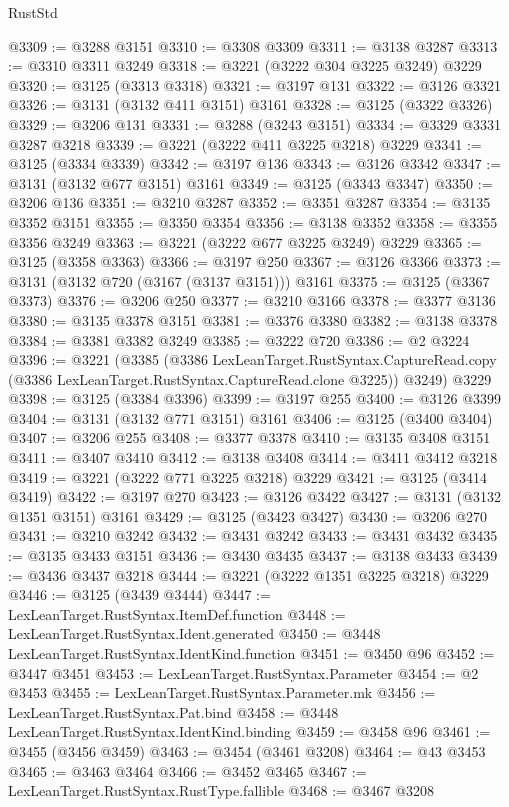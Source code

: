 \begin{lexlean}{RustStd}
\begin{coremodule}
@3309 := @3288 @3151
@3310 := @3308 @3309
@3311 := @3138 @3287
@3313 := @3310 @3311 @3249
@3318 := @3221 (@3222 @304 @3225 @3249) @3229
@3320 := @3125 (@3313 @3318)
@3321 := @3197 @131
@3322 := @3126 @3321
@3326 := @3131 (@3132 @411 @3151) @3161
@3328 := @3125 (@3322 @3326)
@3329 := @3206 @131
@3331 := @3288 (@3243 @3151)
@3334 := @3329 @3331 @3287 @3218
@3339 := @3221 (@3222 @411 @3225 @3218) @3229
@3341 := @3125 (@3334 @3339)
@3342 := @3197 @136
@3343 := @3126 @3342
@3347 := @3131 (@3132 @677 @3151) @3161
@3349 := @3125 (@3343 @3347)
@3350 := @3206 @136
@3351 := @3210 @3287
@3352 := @3351 @3287
@3354 := @3135 @3352 @3151
@3355 := @3350 @3354
@3356 := @3138 @3352
@3358 := @3355 @3356 @3249
@3363 := @3221 (@3222 @677 @3225 @3249) @3229
@3365 := @3125 (@3358 @3363)
@3366 := @3197 @250
@3367 := @3126 @3366
@3373 := @3131 (@3132 @720 (@3167 (@3137 @3151))) @3161
@3375 := @3125 (@3367 @3373)
@3376 := @3206 @250
@3377 := @3210 @3166
@3378 := @3377 @3136
@3380 := @3135 @3378 @3151
@3381 := @3376 @3380
@3382 := @3138 @3378
@3384 := @3381 @3382 @3249
@3385 := @3222 @720
@3386 := @2 @3224
@3396 := @3221
    (@3385
      (@3386
        LexLeanTarget.RustSyntax.CaptureRead.copy
        (@3386 LexLeanTarget.RustSyntax.CaptureRead.clone @3225))
      @3249)
    @3229
@3398 := @3125 (@3384 @3396)
@3399 := @3197 @255
@3400 := @3126 @3399
@3404 := @3131 (@3132 @771 @3151) @3161
@3406 := @3125 (@3400 @3404)
@3407 := @3206 @255
@3408 := @3377 @3378
@3410 := @3135 @3408 @3151
@3411 := @3407 @3410
@3412 := @3138 @3408
@3414 := @3411 @3412 @3218
@3419 := @3221 (@3222 @771 @3225 @3218) @3229
@3421 := @3125 (@3414 @3419)
@3422 := @3197 @270
@3423 := @3126 @3422
@3427 := @3131 (@3132 @1351 @3151) @3161
@3429 := @3125 (@3423 @3427)
@3430 := @3206 @270
@3431 := @3210 @3242
@3432 := @3431 @3242
@3433 := @3431 @3432
@3435 := @3135 @3433 @3151
@3436 := @3430 @3435
@3437 := @3138 @3433
@3439 := @3436 @3437 @3218
@3444 := @3221 (@3222 @1351 @3225 @3218) @3229
@3446 := @3125 (@3439 @3444)
@3447 := LexLeanTarget.RustSyntax.ItemDef.function
@3448 := LexLeanTarget.RustSyntax.Ident.generated
@3450 := @3448 LexLeanTarget.RustSyntax.IdentKind.function
@3451 := @3450 @96
@3452 := @3447 @3451
@3453 := LexLeanTarget.RustSyntax.Parameter
@3454 := @2 @3453
@3455 := LexLeanTarget.RustSyntax.Parameter.mk
@3456 := LexLeanTarget.RustSyntax.Pat.bind
@3458 := @3448 LexLeanTarget.RustSyntax.IdentKind.binding
@3459 := @3458 @96
@3461 := @3455 (@3456 @3459)
@3463 := @3454 (@3461 @3208)
@3464 := @43 @3453
@3465 := @3463 @3464
@3466 := @3452 @3465
@3467 := LexLeanTarget.RustSyntax.RustType.fallible
@3468 := @3467 @3208

\end{coremodule}
\end{lexlean}
